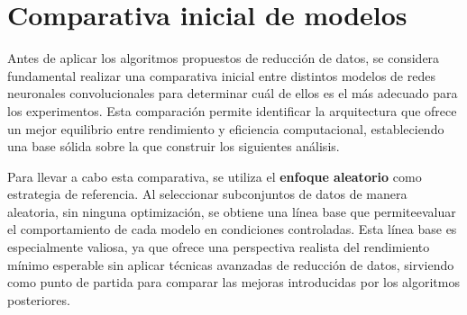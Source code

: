 \section{Comparativa inicial de modelos}\label{sec:comparativa-inicial-modelos}
Antes de aplicar los algoritmos propuestos de reducción de datos, se considera fundamental realizar una comparativa inicial entre distintos
modelos de redes neuronales convolucionales para determinar cuál de ellos es el más adecuado para los experimentos.
Esta comparación permite identificar la arquitectura que ofrece un mejor equilibrio entre rendimiento y eficiencia computacional,
estableciendo una base sólida sobre la que construir los siguientes análisis.

Para llevar a cabo esta comparativa, se utiliza el \textbf{enfoque aleatorio} como estrategia de referencia.
Al seleccionar subconjuntos de datos de manera aleatoria, sin ninguna optimización, se obtiene una línea base que permiteevaluar el
comportamiento de cada modelo en condiciones controladas.
Esta línea base es especialmente valiosa, ya que ofrece una perspectiva realista del rendimiento mínimo esperable sin aplicar técnicas
avanzadas de reducción de datos, sirviendo como punto de partida para comparar las mejoras introducidas por los algoritmos posteriores.


